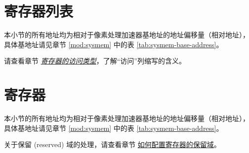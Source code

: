 \documentclass[main\_\_CN.tex]{subfiles}
\begin{document}



\newpage
\hypertarget{ppa-reg-summ}{}
\section{寄存器列表}
\label{sec:ppa-reg-summ}

本小节的所有地址均为相对于像素处理加速器基地址的地址偏移量（相对地址），具体基地址请见章节 \ref{mod:sysmem} \textit{} 中的表 \ref{tab:sysmem-base-address}。

请查看章节 \hyperref[glossary-access-types]{\textit{寄存器的访问类型}}，了解“访问”列缩写的含义。







\newpage
\section{寄存器}

本小节的所有地址均为相对于像素处理加速器基地址的地址偏移量（相对地址），具体基地址请见章节 \ref{mod:sysmem} \textit{} 中的表 \ref{tab:sysmem-base-address}。

关于保留 (reserved) 域的处理，请查看章节 \hyperref[programming-reserved-field]{如何配置寄存器的保留域}。


\end{document}
